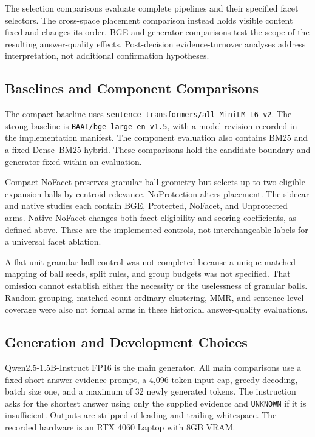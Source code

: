 \documentclass[11pt,a4paper]{article}
\begin{document}
The selection comparisons evaluate complete pipelines and their specified
facet selectors. The cross-space placement comparison instead holds visible
content fixed and changes its order. BGE and generator comparisons test the
scope of the resulting answer-quality effects.
Post-decision evidence-turnover analyses address interpretation, not additional
confirmation hypotheses.

\subsection{Baselines and Component Comparisons}
The compact baseline uses \texttt{sentence-transformers/all-MiniLM-L6-v2}.
The strong baseline is \texttt{BAAI/bge-large-en-v1.5}, with a model revision
recorded in the implementation manifest. The component evaluation also
contains BM25 and a fixed Dense--BM25 hybrid. These comparisons hold the
candidate boundary and generator fixed within an evaluation.

Compact NoFacet preserves granular-ball geometry but selects up to two
eligible expansion balls by centroid relevance. NoProtection alters placement.
The sidecar and native studies each contain BGE, Protected, NoFacet, and
Unprotected arms. Native NoFacet changes both facet eligibility and scoring
coefficients, as defined above. These are the implemented controls, not
interchangeable labels for a universal facet ablation.

A flat-unit granular-ball control was not completed because a unique matched
mapping of ball seeds, split rules, and group budgets was not specified.
That omission cannot establish either the necessity or the uselessness of
granular balls. Random grouping, matched-count ordinary clustering, MMR,
and sentence-level coverage were also not formal arms in these historical
answer-quality evaluations.

\subsection{Generation and Development Choices}
Qwen2.5-1.5B-Instruct FP16 is the main generator. All main comparisons use a
fixed short-answer evidence prompt, a 4,096-token input cap, greedy decoding,
batch size one, and a maximum of 32 newly generated tokens. The instruction
asks for the shortest answer using only the supplied evidence and
\texttt{UNKNOWN} if it is insufficient. Outputs are stripped of leading and
trailing whitespace. The recorded hardware is an RTX 4060 Laptop with 8GB
VRAM.
\end{document}
